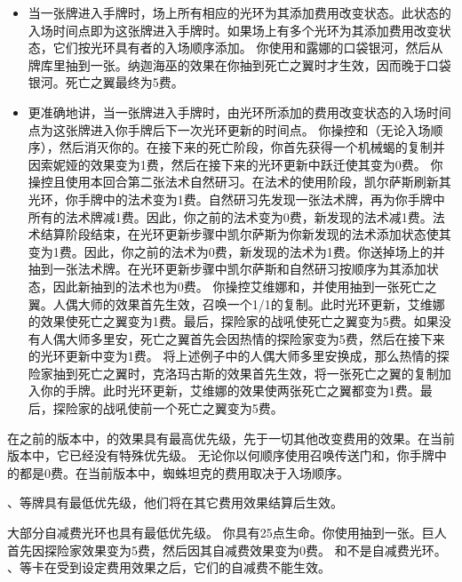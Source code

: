 \begin{itemize}
    \item 当一张牌进入手牌时，场上所有相应的光环为其添加费用改变状态。此状态的入场时间点即为这张牌进入手牌时。如果场上有多个光环为其添加费用改变状态，它们按光环具有者的入场顺序添加。
        \example 你使用和露娜的口袋银河，然后从牌库里抽到一张。纳迦海巫的效果在你抽到死亡之翼时才生效，因而晚于口袋银河。死亡之翼最终为5费。
    \item 更准确地讲，当一张牌进入手牌时，由光环所添加的费用改变状态的入场时间点为这张牌进入你手牌后下一次光环更新的时间点。
        \example 你操控和（无论入场顺序），然后消灭你的。在接下来的死亡阶段，你首先获得一个机械蝎的复制并因索妮娅的效果变为1费，然后在接下来的光环更新中跃迁使其变为0费。
        \example 你操控且使用本回合第二张法术自然研习。在法术的使用阶段，凯尔萨斯刷新其光环，你手牌中的法术变为1费。自然研习先发现一张法术牌，再为你手牌中所有的法术牌减1费。因此，你之前的法术变为0费，新发现的法术减1费。法术结算阶段结束，在光环更新步骤中凯尔萨斯为你新发现的法术添加状态使其变为1费。因此，你之前的法术为0费，新发现的法术为1费。你送掉场上的并抽到一张法术牌。在光环更新步骤中凯尔萨斯和自然研习按顺序为其添加状态，因此新抽到的法术也为0费。
        \example 你操控艾维娜和，并使用抽到一张死亡之翼。人偶大师的效果首先生效，召唤一个1/1的复制。此时光环更新，艾维娜的效果使死亡之翼变为1费。最后，探险家的战吼使死亡之翼变为5费。如果没有人偶大师多里安，死亡之翼首先会因热情的探险家变为5费，然后在接下来的光环更新中变为1费。
        \example 将上述例子中的人偶大师多里安换成，那么热情的探险家抽到死亡之翼时，克洛玛古斯的效果首先生效，将一张死亡之翼的复制加入你的手牌。此时光环更新，艾维娜的效果使两张死亡之翼都变为1费。最后，探险家的战吼使前一个死亡之翼变为5费。
\end{itemize}

在之前的版本中，的效果具有最高优先级，先于一切其他改变费用的效果。在当前版本中，它已经没有特殊优先级。
\example 无论你以何顺序使用召唤传送门和，你手牌中的都是0费。在当前版本中，蜘蛛坦克的费用取决于入场顺序。

、等牌具有最低优先级，他们将在其它费用效果结算后生效。

大部分自减费光环也具有最低优先级。
\example 你具有25点生命。你使用抽到一张。巨人首先因探险家效果变为5费，然后因其自减费效果变为0费。
\notice {}和不是自减费光环。
\exception {}、等卡在受到设定费用效果之后，它们的自减费不能生效。

